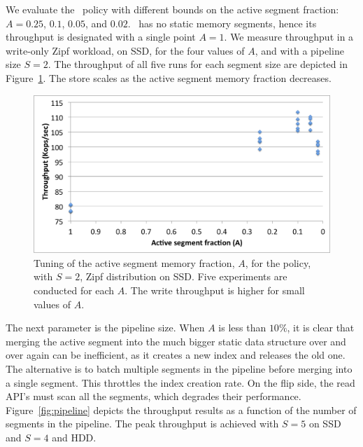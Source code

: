 We evaluate the \basic\ policy with different bounds on the active segment fraction: $A=0.25$, $0.1$, $0.05$, and $0.02$. 
\none\ has no static memory segments, hence its throughput is designated with a single point  $A=1$.
We measure  throughput in a write-only Zipf workload, on SSD,  for the four values of $A$, and with a pipeline size $S=2$.
The throughput of all five runs for each segment size are depicted in  Figure~\ref{fig:dynamic-fraction}. 
The store scales as the active segment memory fraction decreases. 

\begin{figure}[htb]
\includegraphics[width=\figw]{Figs/dynamic-fraction-1.png}
\caption{Tuning of the active segment memory fraction, $A$, for the \basic\/ policy, with $S=2$,
Zipf distribution on SSD.  Five experiments are conducted for each $A$. 
The write throughput is higher for small values of $A$.
}
\label{fig:dynamic-fraction}
\end{figure}

The next parameter is the pipeline size.
When $A$ is less than $10\%$, it is clear that merging the active segment into the much bigger static data structure
over and over again can be inefficient, as it creates a new index and releases the old one. 
The alternative is to batch multiple segments in the pipeline before merging into a single segment. 
This throttles the index creation rate. On the flip side, the read API's must scan all the segments, 
which degrades their performance.
Figure~\ref{fig:pipeline} depicts the throughput results as a function of the number of segments in the pipeline. 
The peak throughput is achieved with $S=5$ on SSD and $S=4$ and HDD.

